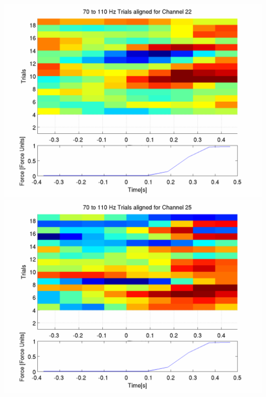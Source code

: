 \documentclass[12pt]{article}
\begin{document}
\includegraphics[scale=0.2]{log_plot_1_aligned_trials.png}
\includegraphics[scale=0.2]{log_plot_2_aligned_trials.png}
\end{document}
